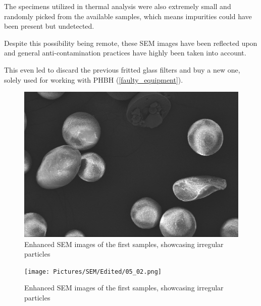\documentclass{article}
\begin{document}
            The specimens utilized in thermal analysis were also extremely small and randomly picked from the available samples, 
            which means impurities could have been present but undetected. 

            Despite this possibility being remote, these SEM images have been reflected upon and general anti-contamination practices
            have highly been taken into account.
            
            This even led to discard the previous fritted glass filters and buy a new one, solely used for working with PHBH (\ref{faulty_equipment}). 

                \begin{figure}[h!]
                    \centering 
                    \includegraphics[width=\textwidth]{Pictures/SEM/Edited/05_01.png}
                    \caption{Enhanced SEM images of the first samples, showcasing irregular particles \autocites{Pixelmator_Pro}{GIMP}}
                    \label{fig:SEM_irregular_particles1}
                \end{figure}

                \begin{figure}[h!]
                    \centering 
                    \texttt{[image: Pictures/SEM/Edited/05\_02.png]}
                    \caption{Enhanced SEM images of the first samples, showcasing irregular particles \autocites{Pixelmator_Pro}{GIMP}}
                    \label{fig:SEM_irregular_particles2}
                \end{figure}
\end{document}
